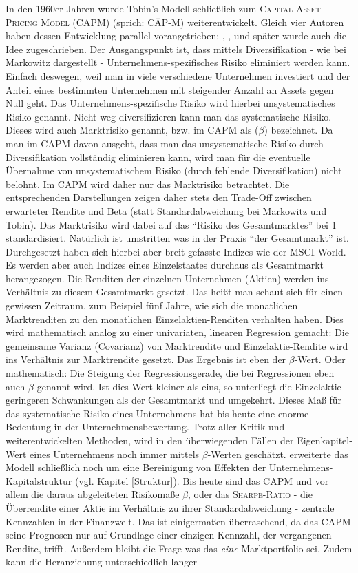 In den 1960er Jahren wurde Tobin's Modell schließlich zum \textsc{Capital Asset Pricing Model (CAPM)} (sprich: CÄP-M) weiterentwickelt. Gleich vier Autoren haben dessen Entwicklung parallel vorangetrieben: \textcite{Sharpe1964}, \textcite{Lintner1965}, \textcite{Mossin1966} und später wurde auch \textcite{Treynor1961} die Idee zugeschrieben. Der Ausgangspunkt ist, dass mittels Diversifikation - wie bei Markowitz dargestellt - Unternehmens-spezifisches Risiko eliminiert werden kann. Einfach deswegen, weil man in viele verschiedene Unternehmen investiert und der Anteil eines bestimmten Unternehmen mit steigender Anzahl an Assets gegen Null geht. Das Unternehmens-spezifische Risiko wird hierbei unsystematisches Risiko genannt. Nicht weg-diversifizieren kann man das systematische Risiko. Dieses wird auch Marktrisiko genannt, bzw. im CAPM als ($\beta$) bezeichnet. Da man im CAPM davon ausgeht, dass man das unsystematische Risiko durch Diversifikation vollständig eliminieren kann, wird man für die eventuelle Übernahme von unsystematischem Risiko (durch fehlende Diversifikation) nicht belohnt. Im CAPM wird daher nur das Marktrisiko betrachtet. Die entsprechenden Darstellungen zeigen daher stets den Trade-Off zwischen erwarteter Rendite und Beta (statt Standardabweichung bei Markowitz und Tobin). Das Marktrisiko wird dabei auf das "`Risiko des Gesamtmarktes"' bei 1 standardisiert. Natürlich ist umstritten was in der Praxis "`der Gesamtmarkt"' ist. Durchgesetzt haben sich hierbei aber breit gefasste Indizes wie der MSCI World. Es werden aber auch Indizes eines Einzelstaates durchaus als Gesamtmarkt herangezogen. Die Renditen der einzelnen Unternehmen (Aktien) werden ins Verhältnis zu diesem Gesamtmarkt gesetzt. Das heißt man schaut sich für einen gewissen Zeitraum, zum Beispiel fünf Jahre, wie sich die monatlichen Marktrenditen zu den monatlichen Einzelaktien-Renditen verhalten haben. Dies wird mathematisch analog zu einer univariaten, linearen Regression gemacht: Die gemeinsame Varianz (Covarianz) von Marktrendite und Einzelaktie-Rendite wird ins Verhältnis zur Marktrendite gesetzt. Das Ergebnis ist eben der $\beta$-Wert. Oder mathematisch: Die Steigung der Regressionsgerade, die bei Regressionen eben auch $\beta$ genannt wird. Ist dies Wert kleiner als eins, so unterliegt die Einzelaktie geringeren Schwankungen als der Gesamtmarkt und umgekehrt. Dieses Maß für das systematische Risiko eines Unternehmens hat bis heute eine enorme Bedeutung in der Unternehmensbewertung. Trotz aller Kritik und weiterentwickelten Methoden, wird in den überwiegenden Fällen der Eigenkapitel-Wert eines Unternehmens noch immer mittels $\beta$-Werten geschätzt. \textcite{Hamada1972} erweiterte das Modell schließlich noch um eine Bereinigung von Effekten der Unternehmens-Kapitalstruktur (vgl. Kapitel \ref{Struktur}). Bis heute sind das CAPM und vor allem die daraus abgeleiteten Risikomaße $\beta$, oder das \textsc{Sharpe-Ratio} - die Überrendite einer Aktie im Verhältnis zu ihrer Standardabweichung - zentrale Kennzahlen in der Finanzwelt. Das ist einigermaßen überraschend, da das CAPM seine Prognosen nur auf Grundlage einer einzigen Kennzahl, der vergangenen Rendite, trifft. Außerdem bleibt die Frage was das \textit{eine} Marktportfolio sei. Zudem kann die Heranziehung unterschiedlich langer 